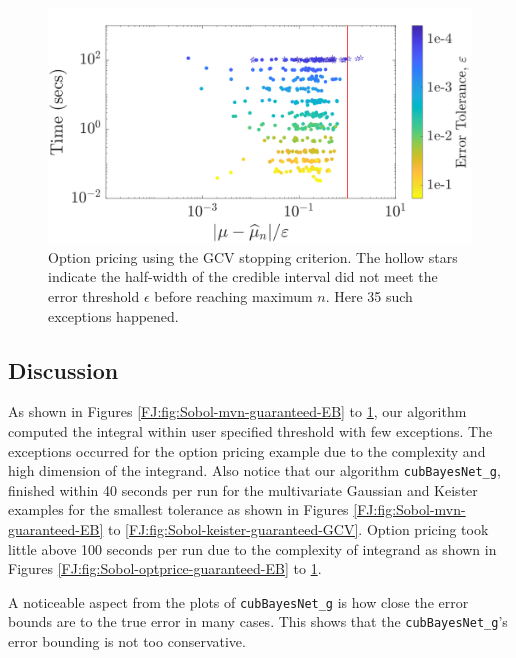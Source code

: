 \documentclass[graybox,footinfo]{svmult}
\newcommand{\FJHNote}[1]{{\textcolor{blue}{FJH: #1}}}
\begin{document}
\begin{figure}
\centering
\includegraphics[width=0.95\linewidth]{"figures/Sobol/Sobol_optPrice_guaranteed_time_GCV__d12_r1_2019-Sep-1"}
\caption[Sobol: Option pricing guaranteed: GCV]{Option pricing using the GCV stopping criterion. The hollow stars indicate the half-width of the credible interval did not meet the error threshold $\epsilon$ before reaching maximum $n$. 
Here 35 such exceptions happened.
}
\label{FJ:fig:Sobol-optprice-guaranteed-GCV}
\end{figure}




\subsection{Discussion}


As shown in Figures \ref{FJ:fig:Sobol-mvn-guaranteed-EB} to \ref{FJ:fig:Sobol-optprice-guaranteed-GCV}, our algorithm computed the integral within user specified threshold with few exceptions. The exceptions occurred for the  option pricing example due to the complexity and high dimension of the integrand. 
Also notice that our algorithm \texttt{cubBayesNet\_g}, finished within 40 seconds per run for the multivariate Gaussian and Keister examples  for the smallest tolerance as shown in Figures \ref{FJ:fig:Sobol-mvn-guaranteed-EB} to \ref{FJ:fig:Sobol-keister-guaranteed-GCV}. Option pricing took little above 100 seconds per run due to the complexity of integrand as shown in Figures \ref{FJ:fig:Sobol-optprice-guaranteed-EB} to \ref{FJ:fig:Sobol-optprice-guaranteed-GCV}.

A  noticeable aspect from the plots of \texttt{cubBayesNet\_g} is how close the error bounds are to the true error in many cases. 
This shows that the \texttt{cubBayesNet\_g}'s error bounding is not too conservative.
\end{document}
